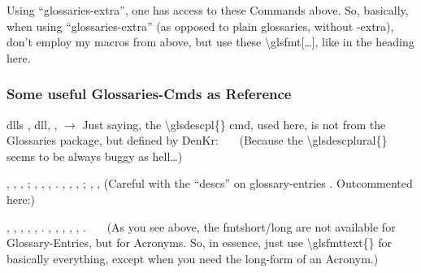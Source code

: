 Using \enquote{glossaries-extra}, one has access to these Commands above.\nl
So, basically, when using \enquote{glossaries-extra} (as opposed to plain glossaries, without -extra), don't employ my macros from above, but use these \textbackslash glsfmt[\ldots], like in the heading here.


\subsubsection{Some useful Glossaries-Cmds as Reference}
\glspl{dll}\nl
{}, \glsdesc{dll}, ,\nl
$\rightarrow$ Just saying, the \textbackslash glsdescpl\{\} cmd, used here, is not from the Glossaries package, but defined by DenKr: %
\nl
\ \ \ (Because the \textbackslash glsdescplural\{\} seems to be always buggy as hell\ldots)

\npi
{}, , , ;\nl
{}, , , .\nl
{}, , , ;\nl
{}, , (Careful with the \enquote{descs} on glossary-entries . Outcommented here:)%

\npi
{}, , , ,\nl
{}, .
\nl
{}, , , ,\nl
{}, .\nl
\ \ \ (As you see above, the fmtshort/long are not available for Glossary-Entries, but for Acronyms. So, in essence, just use \textbackslash glsfmttext\{\} for basically everything, except when you need the long-form of an Acronym.)





